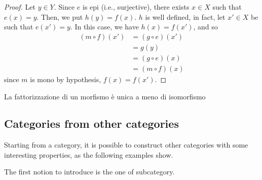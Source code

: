 \begin{proof}
	Let $y \in Y$. Since $e$ is epi (i.e., surjective), there exists $x \in X$ such that $e(x) = y$. Then, we put $h(y) = f(x)$. $h$ is well defined, in fact, let $x' \in X$ be such that $e(x') = y$. In this case, we have $h(x) = f(x')$, and so
	\begin{align*}
		(m \circ f) (x')  &= (g \circ e) (x') \\
				&= g(y)		\\
				&= (g \circ e) (x)	\\
				&= (m \circ f) (x)
	\end{align*}
	since $m$ is mono by hypothesis, $f(x) = f(x')$.
\end{proof}
{\color{red}
\begin{cor}\label{cor:unique}
	La fattorizzazione di un morfismo è unica a meno di isomorfismo 
\end{cor}
}
\subsection{Categories from other categories}\label{ssect:cats_from_cats}

Starting from a category, it is possible to construct other categories with some interesting properties, as the following examples show.

The first notion to introduce is the one of subcategory.

